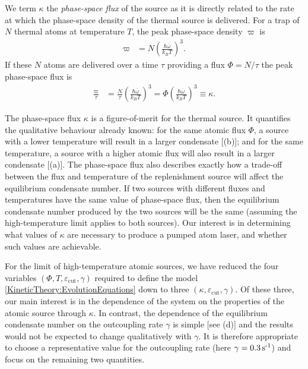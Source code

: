 We term $\kappa$ the \emph{phase-space flux} of the source as it is directly related to the rate at which the phase-space density of the thermal source is delivered.  For a trap of $N$ thermal atoms at temperature $T$, the peak phase-space density $\varpi$ is~\citep[Chapter 2]{PethickSmith}
\begin{align}
    \varpi &= N \left(\frac{\hbar \overline{\omega}}{k_B T} \right)^3.
\end{align}
If these $N$ atoms are delivered over a time $\tau$ providing a flux $\Phi = N/\tau$ the peak phase-space flux is
\begin{align}
    \frac{\varpi}{\tau} &= \frac{N}{\tau}\left(\frac{\hbar \overline{\omega}}{k_B T}\right)^3 = \Phi \left(\frac{\hbar \overline{\omega}}{k_B T}\right)^3 \equiv \kappa.
\end{align}

The phase-space flux $\kappa$ is a figure-of-merit for the thermal source.  It quantifies the qualitative behaviour already known: for the same atomic flux $\Phi$, a source with a lower temperature will result in a larger condensate [(b)]; and for the same temperature, a source with a higher atomic flux will also result in a larger condensate [(a)].  The phase-space flux also describes exactly how a trade-off between the flux and temperature of the replenishment source will affect the equilibrium condensate number.  If two sources with different fluxes and temperatures have the same value of phase-space flux, then the equilibrium condensate number produced by the two sources will be the same (assuming the high-temperature limit applies to both sources).  Our interest is in determining what values of $\kappa$ are necessary to produce a pumped atom laser, and whether such values are achievable.

For the limit of high-temperature atomic sources, we have reduced the four variables $(\Phi, T, \varepsilon_\text{cut}, \gamma)$ required to define the model \eqref{KineticTheory:EvolutionEquations} down to three $(\kappa, \varepsilon_\text{cut}, \gamma)$. Of these three, our main interest is in the dependence of the system on the properties of the atomic source through $\kappa$. In contrast, the dependence of the equilibrium condensate number on the outcoupling rate $\gamma$ is simple [see (d)] and the results would not be expected to change qualitatively with $\gamma$. It is therefore appropriate to choose a representative value for the outcoupling rate (here $\gamma = \unit[0.3]{s\textsuperscript{-1}}$) and focus on the remaining two quantities.

